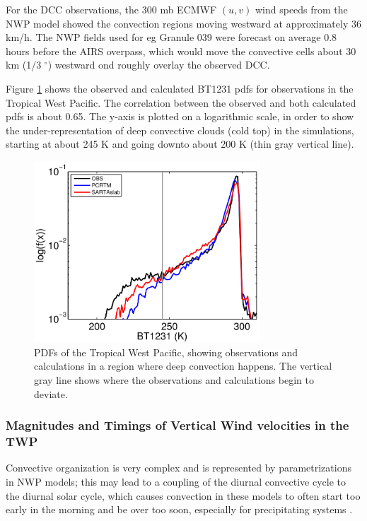 \documentclass[agupp]{aguplus}              %
\newcommand{\mydeg}{\mbox{$^\circ$}}
\begin{document}
\begin{article}
For the DCC observations, the 300 mb ECMWF $(u,v)$ wind speeds from
the NWP model showed the convection regions moving westward at
approximately 36 km/h.  The NWP fields used for eg Granule 039 were
forecast on average 0.8 hours before the AIRS overpass, which would
move the convective cells about 30 km (1/3 \mydeg) westward ond
roughly overlay the observed DCC.

Figure \ref{dcc_pdf} shows the observed and calculated BT1231 pdfs for
observations in the Tropical West Pacific. The correlation between the
observed and both calculated pdfs is about 0.65. The y-axis is plotted
on a logarithmic scale, in order to show the under-representation of
deep convective clouds (cold top) in the simulations, starting at
about 245 K and going downto about 200 K (thin gray vertical line).

\begin{figure}[h]
\noindent\includegraphics[width=20pc]{FIGS/ecm_cloudBT1231_gev_dcc}
\caption{PDFs of the Tropical West Pacific, showing observations and
calculations in a region where deep convection happens. The vertical
gray line shows where the observations and calculations begin to deviate.}
\label{dcc_pdf} 
\end{figure}

\subsubsection{Magnitudes and Timings of Vertical Wind velocities in the TWP}

Convective organization is very complex and is represented by
parametrizations in NWP models; this may lead to a coupling of the
diurnal convective cycle to the diurnal solar cycle, which causes
convection in these models to often start too early in the morning and
be over too soon, especially for precipitating systems \citep{inn:13}.


\end{article}
\end{document}
